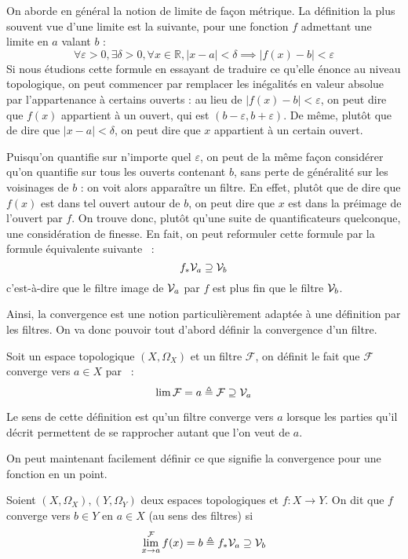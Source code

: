 On aborde en général la notion de limite de façon métrique. La définition la
plus souvent vue d'une limite est la suivante, pour une fonction $f$ admettant
une limite en $a$ valant $b$ :
\[\forall \varepsilon > 0, \exists \delta > 0, \forall x \in \mathbb R,
|x - a| < \delta \implies |f(x) - b| < \varepsilon\]
Si nous étudions cette formule en essayant de traduire ce qu'elle énonce au
niveau topologique, on peut commencer par remplacer les inégalités en valeur
absolue par l'appartenance à certains ouverts : au lieu de
$|f(x) - b| < \varepsilon$, on peut dire que $f(x)$ appartient à un
ouvert, qui est $(b-\varepsilon,b+\varepsilon)$. De même, plutôt que de dire
que $|x - a| < \delta$, on peut dire que $x$ appartient à un certain ouvert.

Puisqu'on quantifie sur n'importe quel $\varepsilon$, on peut de la même façon
considérer qu'on quantifie sur tous les ouverts contenant $b$, sans perte de
généralité sur les voisinages de $b$ : on voit alors apparaître un filtre.
En effet, plutôt que de dire que $f(x)$ est dans tel ouvert autour de $b$,
on peut dire que $x$ est dans la préimage de l'ouvert par $f$. On trouve donc,
plutôt qu'une suite de quantificateurs quelconque, une considération de
finesse. En fait, on peut reformuler cette formule par la formule équivalente
suivante~ :
\[f_*\mathcal{V}_a \supseteq \mathcal{V}_b\]
c'est-à-dire que le filtre image de $\mathcal{V}_a$ par $f$ est plus fin que le filtre
$\mathcal{V}_b$.

Ainsi, la convergence est une notion particulièrement adaptée à une définition
par les filtres. On va donc pouvoir tout d'abord définir la convergence d'un
filtre.

\begin{definition}
  Soit un espace topologique $(X,\Omega_X)$ et un filtre $\mathcal F$, on
  définit le fait que $\mathcal F$ converge vers $a\in X$ par~ :
  \[\lim \mathcal F = a \triangleq \mathcal F \supseteq \mathcal{V}_a\]
\end{definition}

Le sens de cette définition est qu'un filtre converge vers $a$ lorsque les
parties qu'il décrit permettent de se rapprocher autant que l'on veut de
$a$.

On peut maintenant facilement définir ce que signifie la convergence pour une
fonction en un point.

\begin{definition}
  Soient $(X,\Omega_X),(Y,\Omega_Y)$ deux espaces topologiques et $f : X \to Y$.
  On dit que $f$ converge vers $b\in Y$ en $a\in X$ (au sens des filtres) si
  \[\lim^{\mathcal F}_{x\to a}f(x) = b\triangleq f_*\mathcal{V}_a \supseteq\mathcal{V}_b\]
\end{definition}


